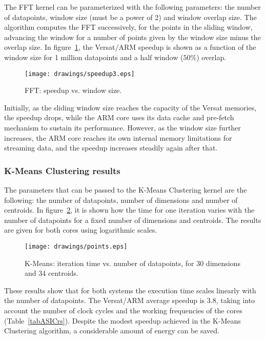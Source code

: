 The FFT kernel can be parameterized with the following parameters: the
number of datapoints, window size (must be a power of 2) and window
overlap size. The algorithm computes the FFT successively, for the
points in the sliding window, advancing the window for a number of
points given by the window size minus the overlap size. In
figure~\ref{fig:fftsu}, the Versat/ARM speedup is shown as a function of
the window size for 1 million datapoints and a half window ($50\%$)
overlap.

\begin{figure}[!htb]
  \centering \texttt{[image: drawings/speedup3.eps]}
  \caption{FFT: speedup vs. window size.}
  \label{fig:fftsu}
\end{figure}

Initially, as the sliding window size reaches the capacity of the
Versat memories, the speedup drops, while the ARM core uses its data
cache and pre-fetch mechanism to sustain its performance. However, as
the window size further increases, the ARM core reaches its own
internal memory limitations for streaming data, and the speedup
increases steadily again after that.

\subsubsection{K-Means Clustering results}

The parameters that can be passed to the K-Means Clustering kernel are
the following: the number of datapoints, number of dimensions and
number of centroids. In figure~\ref{fig:timeVSdpts}, it is shown how
the time for one iteration varies with the number of datapoints for a
fixed number of dimensions and centroids. The results are given for
both cores using logarithmic scales.

\begin{figure}[!htb]
  \centering \texttt{[image: drawings/points.eps]}
  \caption{K-Means: iteration time vs. number of datapoints, for 30 dimensions and 34 centroids.}
  \label{fig:timeVSdpts}
\end{figure}

These results show that for both systems the execution time scales
linearly with the number of datapoints. The Versat/ARM average speedup
is $3.8$, taking into account the number of clock cycles and the
working frequencies of the cores (Table~\ref{tabASICrs}). Despite the
modest speedup achieved in the K-Means Clustering algorithm, a
considerable amount of energy can be saved.

